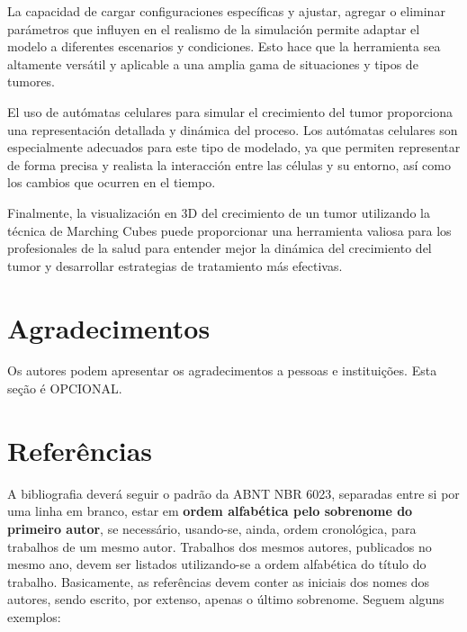 \documentclass[a4paper,11pt]{article}
\begin{document}
{La capacidad de cargar configuraciones específicas y ajustar, agregar o eliminar parámetros que influyen en el realismo de la simulación permite adaptar el modelo a diferentes escenarios y condiciones. Esto hace que la herramienta sea altamente versátil y aplicable a una amplia gama de situaciones y tipos de tumores.

El uso de autómatas celulares para simular el crecimiento del tumor proporciona una representación detallada y dinámica del proceso. Los autómatas celulares son especialmente adecuados para este tipo de modelado, ya que permiten representar de forma precisa y realista la interacción entre las células y su entorno, así como los cambios que ocurren en el tiempo.

Finalmente, la visualización en 3D del crecimiento de un tumor utilizando la técnica de Marching Cubes puede proporcionar una herramienta valiosa para los profesionales de la salud para entender mejor la dinámica del crecimiento del tumor y desarrollar estrategias de tratamiento más efectivas.

\section*{Agradecimentos}

Os autores podem apresentar os agradecimentos a pessoas e instituições. Esta seção é OPCIONAL.




\section*{Referências}
{\color{red} A bibliografia deverá seguir o padrão da ABNT NBR 6023, separadas entre si por uma linha em branco, estar em \textbf{ordem alfabética pelo sobrenome do primeiro autor}, se necessário, usando-se, ainda, ordem cronológica, para trabalhos de um mesmo autor. Trabalhos dos mesmos autores, publicados no mesmo ano, devem ser listados utilizando-se a ordem alfabética do título do trabalho. Basicamente, as referências devem conter as iniciais dos nomes dos autores, sendo escrito, por extenso, apenas o último sobrenome. Seguem alguns exemplos:}


\begin{flushleft}


\end{flushleft}}
\end{document}
